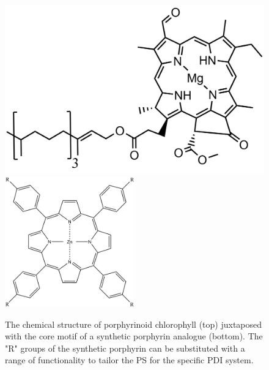 \begin{figure}
    \centering
    \includegraphics[width = \textwidth]{images/PDIpy/background/chlorophyll.png} \\
    \midrule
    \includegraphics[width = 0.5\textwidth]{images/PDIpy/background/zinc_porphyrin.png}
    \caption{
        The chemical structure of porphyrinoid chlorophyll (top) juxtaposed with the core motif of a synthetic porphyrin analogue (bottom). The "R" groups of the synthetic porphyrin can be substituted with a range of functionality to tailor the PS for the specific PDI system.
    }
    \label{zinc_porphyrin}
\end{figure}